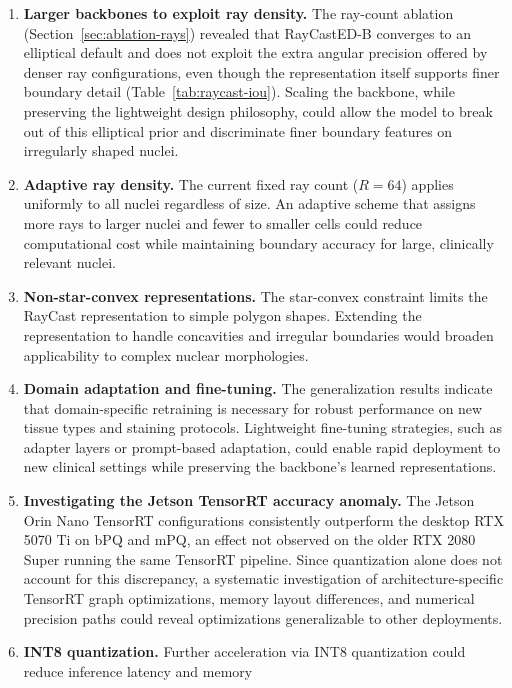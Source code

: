 \begin{enumerate}
	\item \textbf{Larger backbones to exploit ray density.} The ray-count ablation (Section~\ref{sec:ablation-rays})
	      revealed that RayCastED-B converges to an elliptical default and does not exploit the extra angular precision
	      offered by denser ray configurations, even though the representation itself supports finer boundary detail
	      (Table~\ref{tab:raycast-iou}). Scaling the backbone, while preserving the lightweight design philosophy,
	      could allow the model to break out of this elliptical prior and discriminate finer boundary features on
	      irregularly shaped nuclei.
	\item \textbf{Adaptive ray density.} The current fixed ray count ($R = 64$) applies uniformly to all nuclei regardless
	      of size. An adaptive scheme that assigns more rays to larger nuclei and fewer to smaller cells could reduce
	      computational cost while maintaining boundary accuracy for large, clinically relevant nuclei.
	\item \textbf{Non-star-convex representations.} The star-convex constraint limits the RayCast representation to simple
	      polygon shapes. Extending the representation to handle concavities and irregular boundaries would broaden
	      applicability to complex nuclear morphologies.
	\item \textbf{Domain adaptation and fine-tuning.} The generalization results indicate that domain-specific retraining
	      is necessary for robust performance on new tissue types and staining protocols. Lightweight fine-tuning
	      strategies, such as adapter layers or prompt-based adaptation, could enable rapid deployment to new clinical
	      settings while preserving the backbone's learned representations.
	\item \textbf{Investigating the Jetson TensorRT accuracy anomaly.} The Jetson Orin Nano TensorRT configurations
	      consistently outperform the desktop RTX 5070 Ti on bPQ and mPQ, an effect not observed on the older RTX 2080
	      Super running the same TensorRT pipeline. Since quantization alone does not account for this discrepancy, a
	      systematic investigation of architecture-specific TensorRT graph optimizations, memory layout differences, and
	      numerical precision paths could reveal optimizations generalizable to other deployments.
	\item \textbf{INT8 quantization.} Further acceleration via INT8 quantization could reduce inference latency and memory

\end{enumerate}
